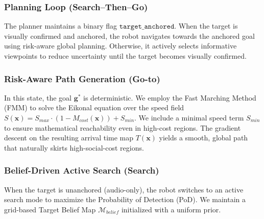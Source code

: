 \subsubsection{Planning Loop (Search--Then--Go)}\label{sec:planning-loop}

The planner maintains a binary flag \(\texttt{target\_anchored}\). When
the target is visually confirmed and anchored, the robot navigates
towards the anchored goal using risk-aware global planning. Otherwise,
it actively selects informative viewpoints to reduce uncertainty until
the target becomes visually confirmed.

\subsubsection{Risk-Aware Path
    Generation (Go-to)}\label{sec:risk-aware-path-generation}

In this state, the goal \(\mathbf{g}^*\) is deterministic. We employ the
Fast Marching Method (FMM) to solve the Eikonal equation over the speed
field \(S(\mathbf{x}) = S_{max} \cdot (1 - M_{cost}(\mathbf{x})) + S_{min}\). We include a minimal speed term \(S_{min}\) to ensure mathematical reachability even in high-cost regions. The
gradient descent on the resulting arrival time map \(T(\mathbf{x})\)
yields a smooth, global path that naturally skirts high-social-cost
regions.

\subsubsection{Belief-Driven Active Search (Search)}\label{sec:belief-driven-active-search}

When the target is unanchored (audio-only), the robot switches to an active search mode to maximize the Probability of Detection (PoD). We maintain a grid-based Target Belief Map \(\mathcal{M}_{belief}\) initialized with a uniform prior.

